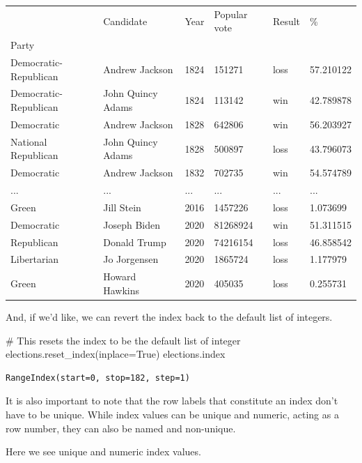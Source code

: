 \documentclass[
  letterpaper,
  DIV=11,
  numbers=noendperiod]{scrreprt}
\newenvironment{Shaded}{\begin{snugshade}}{\end{snugshade}}
\newcommand{\CommentTok}[1]{\textcolor[rgb]{0.37,0.37,0.37}{#1}}
\newcommand{\NormalTok}[1]{\textcolor[rgb]{0.00,0.23,0.31}{#1}}
\newcommand{\OperatorTok}[1]{\textcolor[rgb]{0.37,0.37,0.37}{#1}}
\newcommand{\VariableTok}[1]{\textcolor[rgb]{0.07,0.07,0.07}{#1}}
\begin{document}
\begin{longtable}[]{@{}llllll@{}}
\toprule\noalign{}
& Candidate & Year & Popular vote & Result & \% \\
Party & & & & & \\
\midrule\noalign{}
\endhead
\bottomrule\noalign{}
\endlastfoot
Democratic-Republican & Andrew Jackson & 1824 & 151271 & loss &
57.210122 \\
Democratic-Republican & John Quincy Adams & 1824 & 113142 & win &
42.789878 \\
Democratic & Andrew Jackson & 1828 & 642806 & win & 56.203927 \\
National Republican & John Quincy Adams & 1828 & 500897 & loss &
43.796073 \\
Democratic & Andrew Jackson & 1832 & 702735 & win & 54.574789 \\
... & ... & ... & ... & ... & ... \\
Green & Jill Stein & 2016 & 1457226 & loss & 1.073699 \\
Democratic & Joseph Biden & 2020 & 81268924 & win & 51.311515 \\
Republican & Donald Trump & 2020 & 74216154 & loss & 46.858542 \\
Libertarian & Jo Jorgensen & 2020 & 1865724 & loss & 1.177979 \\
Green & Howard Hawkins & 2020 & 405035 & loss & 0.255731 \\
\end{longtable}

And, if we'd like, we can revert the index back to the default list of
integers.

\begin{Shaded}
\begin{Highlighting}[]
\CommentTok{\# This resets the index to be the default list of integer}
\NormalTok{elections.reset\_index(inplace}\OperatorTok{=}\VariableTok{True}\NormalTok{) }
\NormalTok{elections.index}
\end{Highlighting}
\end{Shaded}

\begin{verbatim}
RangeIndex(start=0, stop=182, step=1)
\end{verbatim}

It is also important to note that the row labels that constitute an
index don't have to be unique. While index values can be unique and
numeric, acting as a row number, they can also be named and non-unique.

Here we see unique and numeric index values.
\end{document}
